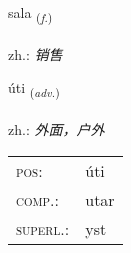 \documentclass[frontgrid, backgrid]{flacards}\usepackage[]{graphicx}\usepackage[]{xcolor}
\begin{document}
\renewcommand{\flhead}{\vskip5pt \fboxsep=0pt {\small\bfseries\footnotesize Nafnorð | 名词}}
\renewcommand{\fcfoot}{\vskip5pt \fboxsep=0pt \hspace{2pt}{\small\bfseries\footnotesize 1K}}

\renewcommand{\blhead}{\vskip5pt {\small\bfseries\footnotesize Nafnorð | 名词 }}
\renewcommand{\bcfoot}{\vskip5pt \hspace{2pt}{\small\bfseries\footnotesize 1K}}


{sala \small{\textsubscript{(\textit{f.})}} \\[1ex] %
\textphonetic{[saːla]} \\
zh.: \emph{销售} \\  [2ex]
\renewcommand*{\arraystretch}{0.8}
}

\renewcommand{\flhead}{\vskip5pt \fboxsep=0pt {\small\bfseries\footnotesize Atviksorð | 副词}}
\renewcommand{\fcfoot}{\vskip5pt \fboxsep=0pt \hspace{2pt}{\small\bfseries\footnotesize 1K}}

\renewcommand{\blhead}{\vskip5pt {\small\bfseries\footnotesize Atviksorð | 副词 }}
\renewcommand{\bcfoot}{\vskip5pt \hspace{2pt}{\small\bfseries\footnotesize 1K}}


{úti \small{\textsubscript{(\textit{adv.})}} \\[1ex] %
\textphonetic{[uːtɪ]} \\
zh.: \emph{外面，户外} \\  [2ex]
\renewcommand*{\arraystretch}{0.8}
\begin{tabular}{ll}
\textsc{pos}: & úti \\ 
\textsc{comp.}: & utar \\ 
\textsc{superl.}: & yst \\
\end{tabular}
}
\end{document}
